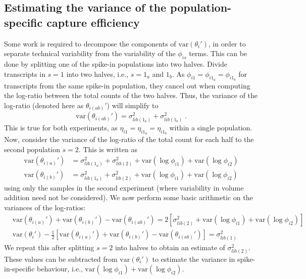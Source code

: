 \documentclass{article}
\begin{document}

\subsection{Estimating the variance of the population-specific capture efficiency}
Some work is required to decompose the components of $\mbox{var}(\theta_i')$, in order to separate technical variability from the variability of the $\phi_{is}$ terms.
This can be done by splitting one of the spike-in populations into two halves.
Divide transcripts in $s=1$ into two halves, i.e., $s=1_a$ and $1_b$.
As $\phi_{i1} = \phi_{i1_a} = \phi_{i1_b}$ for transcripts from the same spike-in population, they cancel out when computing the log-ratio between the total counts of the two halves.
Thus, the variance of the log-ratio (denoted here as $\theta_{i(ab)}'$) will simplify to 
\[
    \mbox{var}(\theta_{i(ab)}') = \sigma^2_{lib(1_a)} + \sigma^2_{lib(1_b)} \;.
\]
This is true for both experiments, as $\eta_{i1} = \eta_{i1_a} = \eta_{i1_b}$ within a single population.
Now, consider the variance of the log-ratio of the total count for each half to the second population $s=2$.
This is written as
\begin{align*}
    \mbox{var}(\theta_{i(a)}') &= \sigma^2_{lib(1_a)} + \sigma^2_{lib(2)} + \mbox{var}(\log \phi_{i1}) + \mbox{var}(\log \phi_{i2}) \\
    \mbox{var}(\theta_{i(b)}') &= \sigma^2_{lib(1_b)} + \sigma^2_{lib(2)} + \mbox{var}(\log \phi_{i1}) + \mbox{var}(\log \phi_{i2})
\end{align*}
using only the samples in the second experiment (where variability in volume addition need not be considered).
We now perform some basic arithmetic on the variances of the log-ratios:
\begin{align*}
    &\mbox{var}(\theta_{i(a)}') +  \mbox{var}(\theta_{i(b)}') - \mbox{var}(\theta_{i(ab)}') = 2 [\sigma^2_{lib(2)} + \mbox{var}(\log \phi_{i1}) + \mbox{var}(\log \phi_{i2}) ] \\
    &\mbox{var}(\theta_i') - \textstyle\frac{1}{2}[\mbox{var}(\theta_{i(a)}') + \mbox{var}(\theta_{i(b)}') - \mbox{var}(\theta_{i(ab)}') ] = \sigma^2_{lib(1)}
\end{align*}
We repeat this after splitting $s=2$ into halves to obtain an estimate of $\sigma^2_{lib(2)}$.
These values can be subtracted from $\mbox{var}(\theta_i')$ to estimate the variance in spike-in-specific behaviour, i.e., $\mbox{var}(\log \phi_{i1}) +  \mbox{var}(\log \phi_{i2})$.
\end{document}
